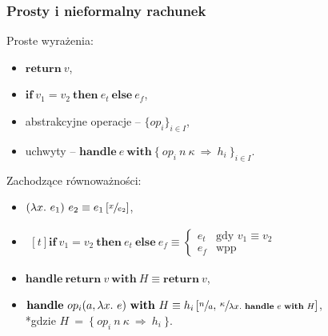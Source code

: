 
\newcommand{\return}[1]{\mathbf{return}\ #1}
\newcommand{\op}[3]{#1(#2, #3)}
\newcommand{\opi}[3]{\op{op_{#1}}{#2}{#3}}
\newcommand{\handle}[2]{\mathbf{handle}\ #1\ \mathbf{with}\ #2}
\newcommand{\hcase}[3]{#1\ #2\ \Rightarrow\ #3}
\newcommand{\fun}[2]{\lambda #1.\ #2}
\newcommand{\cond}[3]{\mathbf{if}\ #1\ \mathbf{then}\ #2\ \mathbf{else}\ #3}

\begin{frame}
  \frametitle{Prosty i nieformalny rachunek}
  Proste wyrażenia:
  \begin{itemize}
  \item \(\return{v}\),
  \item \(\cond{v_1 = v_2}{e_t}{e_f}\),
  \item abstrakcyjne operacje -- \(\{op_i\}_{i \in I}\),
  \item uchwyty -- \(\handle{e}{\{\ \hcase{op_i}{n\ \kappa}{h_i}\ \}_{i \in I}}\).
  \end{itemize}

  \pause
  \vspace{.5em}

  Zachodzące równoważności:
  \begin{itemize}
    \item \((\fun{x}{e_1})\ e_2 \equiv e_1 \left[\sfrac{x}{e_2}\right]\),
    \item
      \(\begin{aligned}[t]
      \cond{v_1 = v_2}{e_t}{e_f} \equiv \left\{\begin{matrix}
      e_t & \text{gdy }v_1 \equiv v_2 \\
      e_f & \text{wpp}
      \end{matrix}\right.
      \end{aligned}\)
    \item \(\handle{\return v}{H} \equiv \return v\),
    \item \(\handle{\opi{i}{a}{\fun{x}{e}}}{H} \equiv h_i \left[\sfrac{n}{a},\, \sfrac{\kappa}{\fun{x}{\handle{e}{H}}}\right] \), \\*gdzie \(H~=~\{\ \hcase{op_i}{n\ \kappa}{h_i} \ \}\).
  \end{itemize}
\end{frame}

